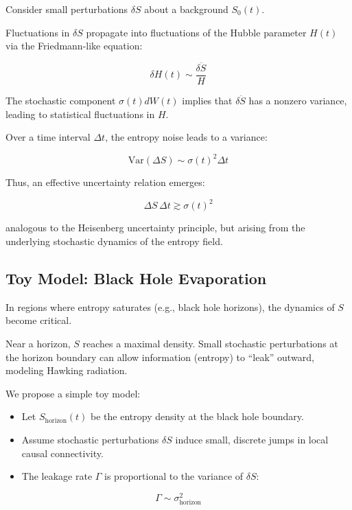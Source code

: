 \documentclass{article}
\begin{document}
Consider small perturbations $\delta S$ about a background $S_0(t)$.

Fluctuations in $\delta S$ propagate into fluctuations of the Hubble parameter $H(t)$ via the Friedmann-like equation:

\[
\delta H(t) \sim \frac{\delta \ddot{S}}{H}
\]

The stochastic component $\sigma(t) dW(t)$ implies that $\delta \ddot{S}$ has a nonzero variance, leading to statistical fluctuations in $H$.

Over a time interval $\Delta t$, the entropy noise leads to a variance:

\[
\text{Var}(\Delta S) \sim \sigma(t)^2 \Delta t
\]

Thus, an effective uncertainty relation emerges:

\begin{equation}
\Delta S \, \Delta t \gtrsim \sigma(t)^2
\label{eq:EntropyUncertainty}
\end{equation}

analogous to the Heisenberg uncertainty principle, but arising from the underlying stochastic dynamics of the entropy field.

\subsection{Toy Model: Black Hole Evaporation}

In regions where entropy saturates (e.g., black hole horizons), the dynamics of $S$ become critical.

Near a horizon, $S$ reaches a maximal density.
Small stochastic perturbations at the horizon boundary can allow information (entropy) to ``leak'' outward, modeling Hawking radiation.

We propose a simple toy model:

\begin{itemize}
\item Let $S_{\text{horizon}}(t)$ be the entropy density at the black hole boundary.
\item Assume stochastic perturbations $\delta S$ induce small, discrete jumps in local causal connectivity.
\item The leakage rate $\Gamma$ is proportional to the variance of $\delta S$:
\end{itemize}

\begin{equation}
\Gamma \sim \sigma_{\text{horizon}}^2
\end{equation}
\end{document}
